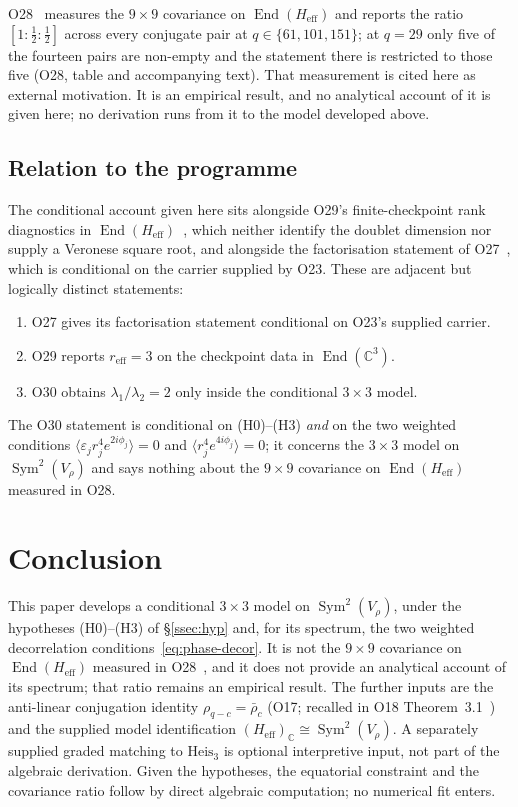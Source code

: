 \documentclass[11pt,a4paper]{article}
\DeclareMathOperator{\Sym}{Sym}
\DeclareMathOperator{\End}{End}
\newcommand{\Heff}{H_{\mathrm{eff}}}
\begin{document}
    O28~\cite{Beau2026a32} measures the $9\times9$ covariance on $\End(\Heff)$ and reports the
    ratio $[1:\tfrac{1}{2}:\tfrac{1}{2}]$ across every conjugate pair at
    $q \in \{61, 101, 151\}$; at $q = 29$ only five of the fourteen pairs are non-empty and the
    statement there is restricted to those five (O28, table and accompanying text).
    That measurement is cited here as external motivation.
    It is an empirical result, and no analytical account of it is given here; no derivation runs
    from it to the model developed above.

  \subsection{Relation to the programme}
  \label{sec:programme}

  The conditional account given here sits alongside O29's finite-checkpoint rank diagnostics
  in $\End(\Heff)$~\cite{Beau2026a33}, which neither identify the doublet dimension nor supply a
  Veronese square root, and alongside the
  factorisation statement of O27~\cite{Beau2026a31}, which is conditional on the carrier supplied by
  O23.
  These are adjacent but logically distinct statements:
  \begin{enumerate}
    \item O27 gives its factorisation statement conditional on O23's supplied carrier.
    \item O29 reports $r_{\mathrm{eff}}=3$ on the checkpoint data in $\End(\mathbb{C}^3)$.
    \item O30 obtains $\lambda_1/\lambda_2=2$ only inside the conditional $3\times3$ model.
  \end{enumerate}
  The O30 statement is conditional on (H0)--(H3) \emph{and} on the two weighted conditions
  $\langle \varepsilon_j r_j^4 e^{2i\phi_j}\rangle = 0$ and
  $\langle r_j^4 e^{4i\phi_j}\rangle = 0$; it concerns the $3\times3$ model on $\Sym^2(V_\rho)$ and
  says nothing about the $9\times9$ covariance on $\End(\Heff)$ measured in O28.

  \newpage
  \section{Conclusion}
  \label{sec:conclusion}

  This paper develops a conditional $3\times3$ model on $\Sym^2(V_\rho)$, under the hypotheses
  (H0)--(H3) of \S\ref{ssec:hyp} and, for its spectrum, the two weighted decorrelation
  conditions~\eqref{eq:phase-decor}.
  It is not the $9\times9$ covariance on $\End(\Heff)$ measured in O28~\cite{Beau2026a32}, and it
  does not provide an analytical account of its spectrum; that ratio remains an empirical result.
  The further inputs are the anti-linear conjugation identity $\rho_{q-c} = \bar\rho_c$ (O17;
  recalled in O18 Theorem~3.1~\cite{Beau2026a22}) and the supplied model identification
  $(\Heff)_{\mathbb{C}} \cong \Sym^2(V_\rho)$.
  A separately supplied graded matching to $\mathrm{Heis}_3$ is optional interpretive input, not
  part of the algebraic derivation.
  Given the hypotheses, the equatorial constraint and the covariance ratio follow by direct
  algebraic computation; no numerical fit enters.
\end{document}
